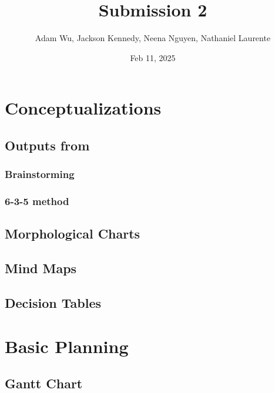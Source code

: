 \documentclass{article}
\title{Submission 2}
\author{Adam Wu, Jackson Kennedy, Neena Nguyen, Nathaniel Laurente}
\date{Feb 11, 2025}
\begin{document}
\maketitle

\tableofcontents

\section{Conceptualizations}

\subsection{Outputs from}
\subsubsection{Brainstorming}

\subsubsection{6-3-5 method}

\subsection{Morphological Charts}

\subsection{Mind Maps}

\subsection{Decision Tables}

\section{Basic Planning}
\subsection{Gantt Chart}
\end{document}
